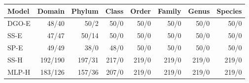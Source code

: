 \begin{center}\scriptsize\begin{tabular}{lrrrrrrr}\toprule
Model & Domain & Phylum & Class & Order & Family & Genus & Species \\
\midrule
DGO-E & 48/40 & 50/2 & 50/0 & 50/0 & 50/0 & 50/0 & 50/0\\
SS-E & 47/47 & 50/14 & 50/0 & 50/0 & 50/0 & 50/0 & 50/0\\
SP-E & 49/49 & 38/0 & 48/0 & 50/0 & 50/0 & 50/0 & 50/0\\
SS-H & 192/190 & 197/31 & 217/0 & 219/0 & 219/0 & 219/0 & 219/0\\
MLP-H & 183/126 & 157/36 & 207/0 & 219/0 & 219/0 & 219/0 & 219/0\\
\bottomrule\end{tabular}\end{center}
